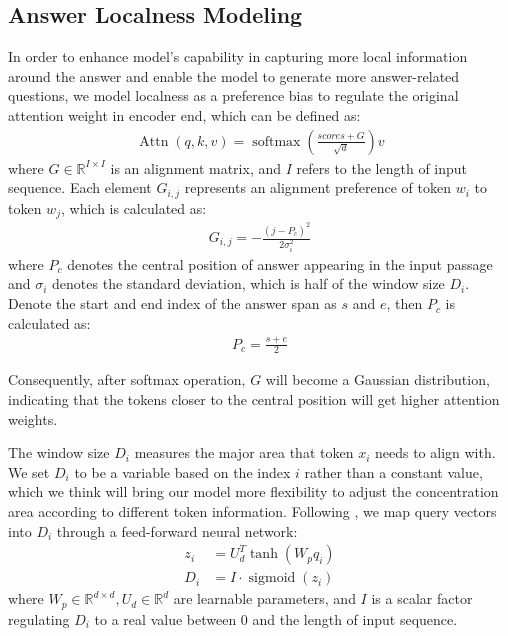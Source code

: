 \documentclass[11pt]{article}
\begin{document}
\subsection{Answer Localness Modeling}
In order to enhance model's capability in capturing more local information around the answer and enable the model to generate more answer-related questions, 
we model localness as a preference bias to regulate the original attention weight in encoder end, which can be defined as:
\begin{gather}
    \operatorname{Attn}(q, k, v) = \operatorname{softmax}(\frac{scores+G}{\sqrt{d}})v
\end{gather}
where $G \in \mathbb{R}^{I\times I}$ is an alignment matrix, and $I$ refers to the length of input sequence. Each element $G_{i,j}$ represents an alignment preference of token $w_i$ to token $w_j$, which is calculated as:
\begin{gather} \label{G-equation}
    G_{i, j} = -\frac{(j-P_c)^2}{2\sigma_i^2}
\end{gather}
where $P_c$ denotes the central position of answer appearing in the input passage and $\sigma_i$ denotes the standard deviation, which is half of the window size $D_i$. Denote the start and end index of the answer span as $s$ and $e$, then $P_c$ is calculated as:
\begin{gather} \label{fixed-center-equation}
    P_c = \frac{s+e}{2}
\end{gather}

Consequently, after softmax operation, $G$ will become a Gaussian distribution, indicating that the tokens closer to the central position will get higher attention weights.


The window size $D_i$ measures the major area that token $x_i$ needs to align with. We set $D_i$ to be a variable based on the index $i$ rather than a constant value, which we think will bring our model more flexibility to adjust the concentration area according to different token information. Following \citet{yang-etal-2018-modeling}, we map query vectors into $D_i$ through a feed-forward neural network:
\begin{align}
    z_i &= U_d^T \operatorname{tanh}(W_p q_i)\\
    D_i &= I \cdot \operatorname{sigmoid}(z_i)
\end{align}
where $W_p \in \mathbb{R}^{d\times d}, U_d \in \mathbb{R}^d$ are learnable parameters, and $I$ is a scalar factor regulating $D_i$ to a real value between 0 and the length of input sequence.
\end{document}
